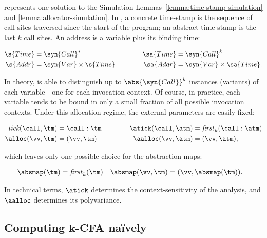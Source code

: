 \kCFA{} represents one solution to the Simulation
Lemmas~\ref{lemma:time-stamp-simulation} and
\ref{lemma:allocator-simulation}.
In \kCFA{}, a concrete time-stamp is the sequence of call
sites traversed since the start of the program; an abstract
time-stamp is the last $k$ call sites.
An address is a variable plus its binding time:
\begin{small}\begin{align*}
  \s{Time} &= \syn{Call}^*                    & \sa{Time} &= \syn{Call}^k
  \\
  \s{Addr} &= \syn{Var} \times \s{Time} \;\;\;\;\;\;\;\;\;\;\;
  & \sa{Addr} &= \syn{Var} \times \sa{Time}
  \text.
\end{align*}\end{small}In theory, \kCFA{} is able to distinguish up to $\abs{\syn{Call}}^k$
instances (variants) of each variable---one for each invocation
context.
Of course, in practice, each variable tends to be bound in only a
small fraction of all possible invocation contexts.
Under this allocation regime, the external parameters are easily fixed:
\begin{small}\begin{align*}
  \mathit{tick}(\call,\tm) & = \call : \tm   \;\;\;\;\;\;\;\;\;\;\;
  & \atick(\call,\atm) &= \mathit{first}_k(\call : \atm)
  \\
  \alloc(\vv,\tm) & = (\vv,\tm)             & \aalloc(\vv,\atm) &= (\vv,\atm)
  \text,
\end{align*}\end{small}which leaves only one possible choice for the abstraction maps:
\begin{small}\begin{align*}
  \absmap(\tm) &= \mathit{first}_k(\tm)
  &
  \absmap(\vv,\tm) &= (\vv,\absmap(\tm))
  \text.
\end{align*}\end{small}In technical terms, $\atick$ determines the context-sensitivity of the
analysis, and $\aalloc$ determines its polyvariance.



\subsection{Computing $\boldsymbol k$-CFA na\"ively}

